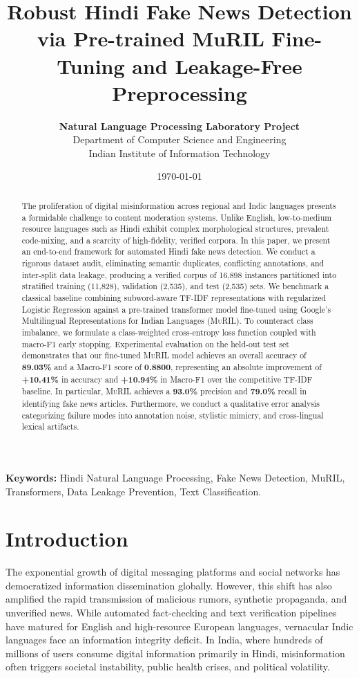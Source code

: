 \documentclass[11pt,a4paper]{article}
\title{\textbf{Robust Hindi Fake News Detection via Pre-trained MuRIL Fine-Tuning and Leakage-Free Preprocessing}}
\author{
    \textbf{Natural Language Processing Laboratory Project} \\
    Department of Computer Science and Engineering \\
    Indian Institute of Information Technology
}
\date{\today}
\begin{document}
\maketitle

\begin{abstract}
The proliferation of digital misinformation across regional and Indic languages presents a formidable challenge to content moderation systems. Unlike English, low-to-medium resource languages such as Hindi exhibit complex morphological structures, prevalent code-mixing, and a scarcity of high-fidelity, verified corpora. In this paper, we present an end-to-end framework for automated Hindi fake news detection. We conduct a rigorous dataset audit, eliminating semantic duplicates, conflicting annotations, and inter-split data leakage, producing a verified corpus of 16,898 instances partitioned into stratified training (11,828), validation (2,535), and test (2,535) sets. We benchmark a classical baseline combining subword-aware TF-IDF representations with regularized Logistic Regression against a pre-trained transformer model fine-tuned using Google's Multilingual Representations for Indian Languages (\textsc{MuRIL}). To counteract class imbalance, we formulate a class-weighted cross-entropy loss function coupled with macro-F1 early stopping. Experimental evaluation on the held-out test set demonstrates that our fine-tuned \textsc{MuRIL} model achieves an overall accuracy of \textbf{89.03\%} and a Macro-F1 score of \textbf{0.8800}, representing an absolute improvement of \textbf{+10.41\%} in accuracy and \textbf{+10.94\%} in Macro-F1 over the competitive TF-IDF baseline. In particular, \textsc{MuRIL} achieves a \textbf{93.0\%} precision and \textbf{79.0\%} recall in identifying fake news articles. Furthermore, we conduct a qualitative error analysis categorizing failure modes into annotation noise, stylistic mimicry, and cross-lingual lexical artifacts.
\end{abstract}

\vspace{0.5em}
\noindent\textbf{Keywords:} Hindi Natural Language Processing, Fake News Detection, MuRIL, Transformers, Data Leakage Prevention, Text Classification.

\section{Introduction}
\label{sec:intro}

The exponential growth of digital messaging platforms and social networks has democratized information dissemination globally. However, this shift has also amplified the rapid transmission of malicious rumors, synthetic propaganda, and unverified news. While automated fact-checking and text verification pipelines have matured for English and high-resource European languages, vernacular Indic languages face an information integrity deficit. In India, where hundreds of millions of users consume digital information primarily in Hindi, misinformation often triggers societal instability, public health crises, and political volatility.
\end{document}
